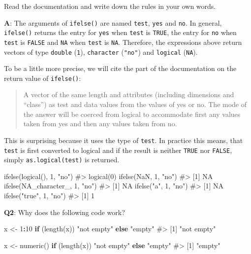 \documentclass[
]{krantz}
\makeatletter
\newenvironment{Shaded}{\begin{snugshade}}{\end{snugshade}}
\newcommand{\CommentTok}[1]{\textcolor[rgb]{0.56,0.35,0.01}{\textit{#1}}}
\newcommand{\ControlFlowTok}[1]{\textcolor[rgb]{0.13,0.29,0.53}{\textbf{#1}}}
\newcommand{\DecValTok}[1]{\textcolor[rgb]{0.00,0.00,0.81}{#1}}
\newcommand{\KeywordTok}[1]{\textcolor[rgb]{0.13,0.29,0.53}{\textbf{#1}}}
\newcommand{\NormalTok}[1]{#1}
\newcommand{\OperatorTok}[1]{\textcolor[rgb]{0.81,0.36,0.00}{\textbf{#1}}}
\newcommand{\OtherTok}[1]{\textcolor[rgb]{0.56,0.35,0.01}{#1}}
\newcommand{\StringTok}[1]{\textcolor[rgb]{0.31,0.60,0.02}{#1}}
\newenvironment{kframe}{%
\medskip{}
\setlength{\fboxsep}{.8em}
 \def\at@end@of@kframe{}%
 \ifinner\ifhmode%
  \def\at@end@of@kframe{\end{minipage}}%
  \begin{minipage}{\columnwidth}%
 \fi\fi%
 \def\FrameCommand##1{\hskip\@totalleftmargin \hskip-\fboxsep
 \colorbox{shadecolor}{##1}\hskip-\fboxsep
     \hskip-\linewidth \hskip-\@totalleftmargin \hskip\columnwidth}%
 \MakeFramed {\advance\hsize-\width
   \@totalleftmargin\z@ \linewidth\hsize
   \@setminipage}}%
 {\par\unskip\endMakeFramed%
 \at@end@of@kframe}
\renewenvironment{Shaded}{\begin{kframe}}{\end{kframe}}
\renewcommand{\KeywordTok} [1]{\textcolor[rgb]{0.00,0.44,0.13}{{#1}}}
\renewcommand{\DecValTok}  [1]{\textcolor[rgb]{0.25,0.63,0.44}{{#1}}}
\renewcommand{\StringTok}  [1]{\textcolor[rgb]{0.25,0.44,0.63}{{#1}}}
\renewcommand{\CommentTok} [1]{\textcolor[rgb]{0.38,0.63,0.69}{{#1}}}
\renewcommand{\OtherTok}   [1]{\textcolor[rgb]{0.00,0.44,0.13}{{#1}}}
\renewcommand{\NormalTok}  [1]{{#1}}
\makeatother
\begin{document}
Read the documentation and write down the rules in your own words.

\textbf{{A}}: The arguments of \texttt{ifelse()} are named \texttt{test}, \texttt{yes} and \texttt{no}. In general, \texttt{ifelse()} returns the entry for \texttt{yes} when \texttt{test} is \texttt{TRUE}, the entry for \texttt{no} when \texttt{test} is \texttt{FALSE} and \texttt{NA} when \texttt{test} is \texttt{NA}. Therefore, the expressions above return vectors of type \texttt{double} (\texttt{1}), \texttt{character} (\texttt{"no"}) and \texttt{logical} (\texttt{NA}).

To be a little more precise, we will cite the part of the documentation on the return value of \texttt{ifelse()}:

\begin{quote}
A vector of the same length and attributes (including dimensions and ``class'') as test and data values from the values of yes or no. The mode of the answer will be coerced from logical to accommodate first any values taken from yes and then any values taken from no.
\end{quote}

This is surprising because it uses the type of \texttt{test}. In practice this means, that \texttt{test} is first converted to logical and if the result is neither \texttt{TRUE} nor \texttt{FALSE}, simply \texttt{as.logical(test)} is returned.

\begin{Shaded}
\begin{Highlighting}[]
\KeywordTok{ifelse}\NormalTok{(}\KeywordTok{logical}\NormalTok{(), }\DecValTok{1}\NormalTok{, }\StringTok{"no"}\NormalTok{)}
\CommentTok{#> logical(0)}
\KeywordTok{ifelse}\NormalTok{(}\OtherTok{NaN}\NormalTok{, }\DecValTok{1}\NormalTok{, }\StringTok{"no"}\NormalTok{)}
\CommentTok{#> [1] NA}
\KeywordTok{ifelse}\NormalTok{(}\OtherTok{NA_character_}\NormalTok{, }\DecValTok{1}\NormalTok{, }\StringTok{"no"}\NormalTok{)}
\CommentTok{#> [1] NA}
\KeywordTok{ifelse}\NormalTok{(}\StringTok{"a"}\NormalTok{, }\DecValTok{1}\NormalTok{, }\StringTok{"no"}\NormalTok{)}
\CommentTok{#> [1] NA}
\KeywordTok{ifelse}\NormalTok{(}\StringTok{"true"}\NormalTok{, }\DecValTok{1}\NormalTok{, }\StringTok{"no"}\NormalTok{)}
\CommentTok{#> [1] 1}
\end{Highlighting}
\end{Shaded}

\textbf{{Q2}}: Why does the following code work?

\begin{Shaded}
\begin{Highlighting}[]
\NormalTok{x <-}\StringTok{ }\DecValTok{1}\OperatorTok{:}\DecValTok{10}
\ControlFlowTok{if}\NormalTok{ (}\KeywordTok{length}\NormalTok{(x)) }\StringTok{"not empty"} \ControlFlowTok{else} \StringTok{"empty"}
\CommentTok{#> [1] "not empty"}

\NormalTok{x <-}\StringTok{ }\KeywordTok{numeric}\NormalTok{()}
\ControlFlowTok{if}\NormalTok{ (}\KeywordTok{length}\NormalTok{(x)) }\StringTok{"not empty"} \ControlFlowTok{else} \StringTok{"empty"}
\CommentTok{#> [1] "empty"}
\end{Highlighting}
\end{Shaded}
\end{document}
